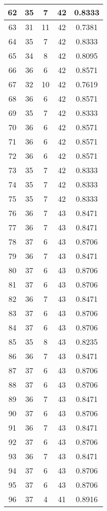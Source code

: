 \documentclass[letterpaper, 12pt]{article}
\begin{document}
\begin{longtable}{|c|c|c|c|c|}
\hline
62 & 35 & 7 & 42 & 0.8333 \\
\hline
63 & 31 & 11 & 42 & 0.7381 \\
\hline
64 & 35 & 7 & 42 & 0.8333 \\
\hline
65 & 34 & 8 & 42 & 0.8095 \\
\hline
66 & 36 & 6 & 42 & 0.8571 \\
\hline
67 & 32 & 10 & 42 & 0.7619 \\
\hline
68 & 36 & 6 & 42 & 0.8571 \\
\hline
69 & 35 & 7 & 42 & 0.8333 \\
\hline
70 & 36 & 6 & 42 & 0.8571 \\
\hline
71 & 36 & 6 & 42 & 0.8571 \\
\hline
72 & 36 & 6 & 42 & 0.8571 \\
\hline
73 & 35 & 7 & 42 & 0.8333 \\
\hline
74 & 35 & 7 & 42 & 0.8333 \\
\hline
75 & 35 & 7 & 42 & 0.8333 \\
\hline
76 & 36 & 7 & 43 & 0.8471 \\
\hline
77 & 36 & 7 & 43 & 0.8471 \\
\hline
78 & 37 & 6 & 43 & 0.8706 \\
\hline
79 & 36 & 7 & 43 & 0.8471 \\
\hline
80 & 37 & 6 & 43 & 0.8706 \\
\hline
81 & 37 & 6 & 43 & 0.8706 \\
\hline
82 & 36 & 7 & 43 & 0.8471 \\
\hline
83 & 37 & 6 & 43 & 0.8706 \\
\hline
84 & 37 & 6 & 43 & 0.8706 \\
\hline
85 & 35 & 8 & 43 & 0.8235 \\
\hline
86 & 36 & 7 & 43 & 0.8471 \\
\hline
87 & 37 & 6 & 43 & 0.8706 \\
\hline
88 & 37 & 6 & 43 & 0.8706 \\
\hline
89 & 36 & 7 & 43 & 0.8471 \\
\hline
90 & 37 & 6 & 43 & 0.8706 \\
\hline
91 & 36 & 7 & 43 & 0.8471 \\
\hline
92 & 37 & 6 & 43 & 0.8706 \\
\hline
93 & 36 & 7 & 43 & 0.8471 \\
\hline
94 & 37 & 6 & 43 & 0.8706 \\
\hline
95 & 37 & 6 & 43 & 0.8706 \\
\hline
96 & 37 & 4 & 41 & 0.8916 \\

\end{longtable}
\end{document}
